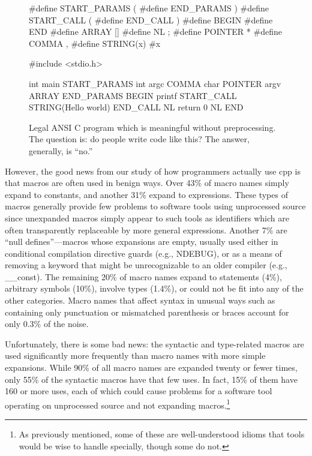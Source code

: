\documentclass{article}
\newcommand{\Cpp}{\mbox{\textsf{cpp}}}
\newcommand{\C}{\mbox{\textsf{C}}}
\newcommand{\eg}{e.g.,}
\begin{document}
\begin{figure}[hbt]
\begin{center}
\begin{small}
\begin{pseudocode}[5.5in]
#define START_PARAMS (
#define END_PARAMS )
#define START_CALL (
#define END_CALL )
#define BEGIN {
#define END }
#define ARRAY []
#define NL ;
#define POINTER *
#define COMMA ,
#define STRING(x) #x

#include <stdio.h>

int main START_PARAMS int argc COMMA char POINTER argv ARRAY END_PARAMS BEGIN
  printf START_CALL STRING(Hello world\n) END_CALL NL
  return 0 NL
END
\end{pseudocode}
\end{small}
\caption{Legal ANSI \C{} program which is meaningful without
  preprocessing.  The question is: do people write code like this?  The
  answer, generally, is ``no.''}
\label{fig:worstcase}
\end{center}
\end{figure}

However, the good news from our study of how programmers actually use
\Cpp{} is that macros are often used in benign ways.  Over 43\% of macro
names simply expand to constants, and another 31\% expand to
expressions.  These types of macros generally provide few problems to
software tools using unprocessed source since unexpanded macros simply
appear to such tools as identifiers which are often transparently
replaceable by more general expressions.  Another 7\% are ``null
defines''---macros whose expansions are empty, usually used either in
conditional compilation directive guards (\eg{} NDEBUG), or as a means
of removing a keyword that might be unrecognizable to an older compiler
(\eg{} \_\_const).  The remaining 20\% of macro names expand to statements
(4\%), arbitrary symbols (10\%), involve types (1.4\%), or could not be
fit into any of the other categories.  Macro names that affect syntax in
unusual ways such as containing only punctuation or mismatched
parenthesis or braces account for only 0.3\% of the noise.

Unfortunately, there is some bad news: the syntactic and type-related
macros are used significantly more frequently than macro names with more
simple expansions.  While 90\% of all macro names are expanded twenty or
fewer times, only 55\% of the syntactic macros have that few uses.  In
fact, 15\% of them have 160 or more uses, each of which could cause
problems for a software tool operating on unprocessed source and not
expanding macros.\footnote{As previously mentioned, some of these are
  well-understood idioms that tools would be wise to handle specially,
  though some do not.}
\end{document}
